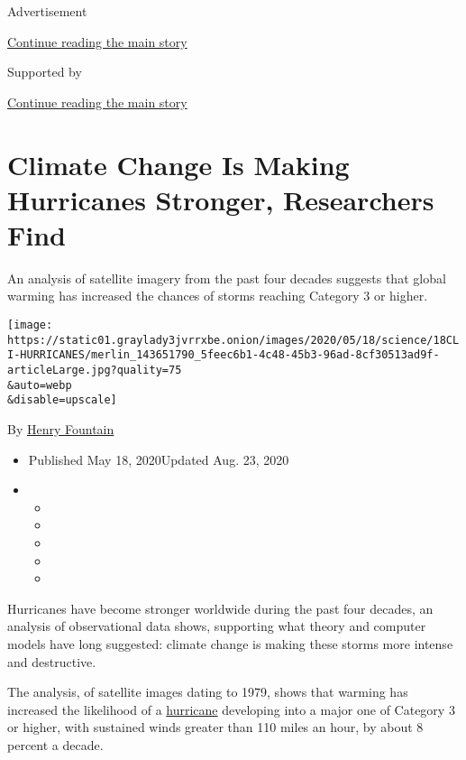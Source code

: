 Advertisement

\protect\hyperlink{after-top}{Continue reading the main story}

Supported by

\protect\hyperlink{after-sponsor}{Continue reading the main story}

\hypertarget{climate-change-is-making-hurricanes-stronger-researchers-find}{%
\section{Climate Change Is Making Hurricanes Stronger, Researchers
Find}\label{climate-change-is-making-hurricanes-stronger-researchers-find}}

An analysis of satellite imagery from the past four decades suggests
that global warming has increased the chances of storms reaching
Category 3 or higher.

\texttt{[image: https://static01.graylady3jvrrxbe.onion/images/2020/05/18/science/18CLI-HURRICANES/merlin\_143651790\_5feec6b1-4c48-45b3-96ad-8cf30513ad9f-articleLarge.jpg?quality=75\\\&auto=webp\\\&disable=upscale]}

By \href{https://www.nytimes3xbfgragh.onion/by/henry-fountain}{Henry
Fountain}

\begin{itemize}
\item
  Published May 18, 2020Updated Aug. 23, 2020
\item
  \begin{itemize}
  \item
  \item
  \item
  \item
  \item
  \end{itemize}
\end{itemize}

Hurricanes have become stronger worldwide during the past four decades,
an analysis of observational data shows, supporting what theory and
computer models have long suggested: climate change is making these
storms more intense and destructive.

The analysis, of satellite images dating to 1979, shows that warming has
increased the likelihood of a
\href{https://www.nytimes3xbfgragh.onion/2020/08/23/us/tropical-storm-laura-marco-louisiana.html}{hurricane}
developing into a major one of Category 3 or higher, with sustained
winds greater than 110 miles an hour, by about 8 percent a decade.

